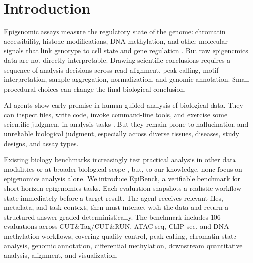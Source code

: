 \documentclass[10pt,letterpaper]{article}
\begin{document}
\clearpage

{\fontsize{9.1}{12.8}\selectfont
\newcommand{\TwoColParaBreak}{\par\vspace{0.62em}\noindent}
\noindent\begin{minipage}[t]{0.47\textwidth}
\setlength{\parskip}{0pt}
\setlength{\parindent}{0pt}

\section{Introduction}

Epigenomic assays measure the regulatory state of the genome: chromatin
accessibility, histone modifications, DNA methylation, and other molecular
signals that link genotype to cell state and gene regulation
\cite{encode2012,roadmap2015}. But raw epigenomics data are not directly
interpretable. Drawing scientific conclusions requires a sequence of analysis
decisions across read alignment, peak calling, motif interpretation, sample
aggregation, normalization, and genomic annotation. Small procedural choices
can change the final biological conclusion.

\TwoColParaBreak
AI agents show early promise in human-guided analysis of biological data. They
can inspect files, write code, invoke command-line tools, and exercise some
scientific judgment in analysis tasks
\cite{bixbench2025,compbiobench2026,biomysterybench2026}. But they remain prone to hallucination
and unreliable biological judgment, especially across diverse tissues,
diseases, study designs, and assay types.

\TwoColParaBreak
Existing biology benchmarks increasingly test practical analysis in other data
modalities or at broader biological scope
\cite{labbench2024,bixbench2025,biomnibench2026,compbiobench2026,genebench2026,workman2025spatialbench,workman2026scbench},
but, to our
knowledge, none focus on epigenomics analysis alone. We introduce EpiBench, a
verifiable benchmark for short-horizon epigenomics tasks. Each evaluation
snapshots a realistic workflow state immediately before a target result. The
agent receives relevant files, metadata, and task context, then must interact
with the data and return a structured answer graded deterministically. The
benchmark includes 106 evaluations across CUT\&Tag/CUT\&RUN, ATAC-seq,
ChIP-seq, and DNA methylation workflows, covering quality control, peak
calling, chromatin-state analysis, genomic annotation, differential
methylation, downstream quantitative analysis, alignment, and visualization.


\end{minipage}}
\end{document}
